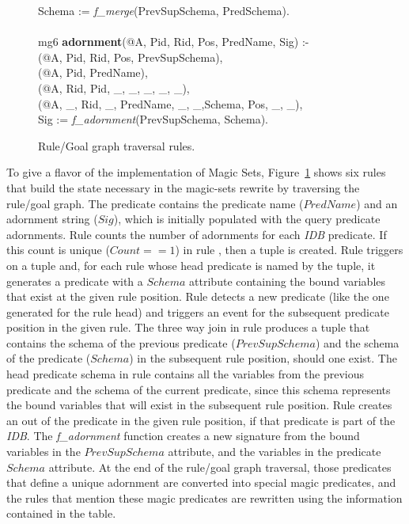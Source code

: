 \begin{figure}
\begin{boxedminipage}{\linewidth}
\datalogspace Schema := {\em f\_merge}(PrevSupSchema, PredSchema).\\
\\
mg6 {\bf adornment}(@A, Pid, Rid, Pos, PredName, Sig) :- \\
(@A, Pid, Rid, Pos, PrevSupSchema),\\
(@A, Pid, PredName), \\
(@A, Rid, Pid, \_, \_, \_, \_, \_),\\
(@A, \_, Rid, \_, PredName, \_, \_,Schema, Pos, \_, \_),\\ 
\datalogspace Sig := {\em f\_adornment}(PrevSupSchema, Schema).
\end{boxedminipage}
\caption{\label{ch:evita:fig:magicRules}Rule/Goal graph traversal rules.}
\end{figure}

To give a flavor of the \OVERLOG implementation of Magic Sets,
Figure~\ref{ch:evita:fig:magicRules} shows six rules that build the state
necessary in the magic-sets rewrite by traversing the rule/goal graph.  The
 predicate contains the predicate name ($PredName$) and an
adornment string ($Sig$), which is initially populated with the query predicate
adornments.  Rule  counts the number of adornments for each {\em IDB}
predicate.  If this count is unique ($Count == 1$) in rule , then a
 tuple is created.  Rule  triggers on a 
tuple and, for each rule whose head predicate is named by the 
tuple, it generates a  predicate with a $Schema$ attribute containing
the bound variables that exist at the given rule position.  Rule 
detects a new  predicate (like the one generated for the rule head) and
triggers an event for the subsequent  predicate position in the given
rule.  The three way join in rule  produces a tuple that contains the
schema of the previous  predicate ($PrevSupSchema$) and the schema of
the predicate ($Schema$) in the subsequent rule position, should one exist.
The head  predicate schema in rule  contains all the variables
from the previous  predicate and the schema of the current predicate,
since this schema represents the bound variables that will exist in the
subsequent rule position.  Rule  creates an  out of the
predicate in the given rule position, if that predicate is part of the {\em
IDB}.  The {\em f\_adornment} function creates a new signature from the bound
variables in the $PrevSupSchema$ attribute, and the variables in the predicate
$Schema$ attribute.  At the end of the rule/goal graph traversal, those
predicates that define a unique adornment are converted into special magic
predicates, and the rules that mention these magic predicates are rewritten
using the information contained in the  table.


